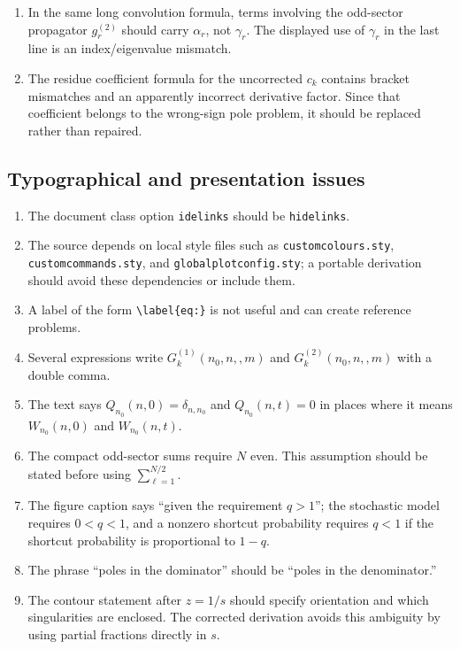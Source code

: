 \documentclass[11pt]{article}
\begin{document}
\begin{enumerate}
\item In the same long convolution formula, terms involving the odd-sector propagator
$g^{(2)}_r$ should carry $\alpha_r$, not $\gamma_r$.  The displayed use of $\gamma_r$ in the last
line is an index/eigenvalue mismatch.

\item The residue coefficient formula for the uncorrected $c_k$ contains bracket mismatches and an
apparently incorrect derivative factor.  Since that coefficient belongs to the wrong-sign pole
problem, it should be replaced rather than repaired.
\end{enumerate}

\subsection{Typographical and presentation issues}

\begin{enumerate}
\item The document class option \texttt{idelinks} should be \texttt{hidelinks}.
\item The source depends on local style files such as \texttt{customcolours.sty},
\texttt{customcommands.sty}, and \texttt{globalplotconfig.sty}; a portable derivation should avoid
these dependencies or include them.
\item A label of the form \verb|\label{eq:}| is not useful and can create reference problems.
\item Several expressions write $G^{(1)}_k(n_0,n,,m)$ and $G^{(2)}_k(n_0,n,,m)$ with a double
comma.
\item The text says $Q_{n_0}(n,0)=\delta_{n,n_0}$ and $Q_{n_0}(n,t)=0$ in places where it means
$W_{n_0}(n,0)$ and $W_{n_0}(n,t)$.
\item The compact odd-sector sums require $N$ even.  This assumption should be stated before using
$\sum_{\ell=1}^{N/2}$.
\item The figure caption says ``given the requirement $q>1$''; the stochastic model requires
$0<q<1$, and a nonzero shortcut probability requires $q<1$ if the shortcut probability is
proportional to $1-q$.
\item The phrase ``poles in the dominator'' should be ``poles in the denominator.''
\item The contour statement after $z=1/s$ should specify orientation and which singularities are
enclosed.  The corrected derivation avoids this ambiguity by using partial fractions directly in
$s$.
\end{enumerate}
\end{document}
